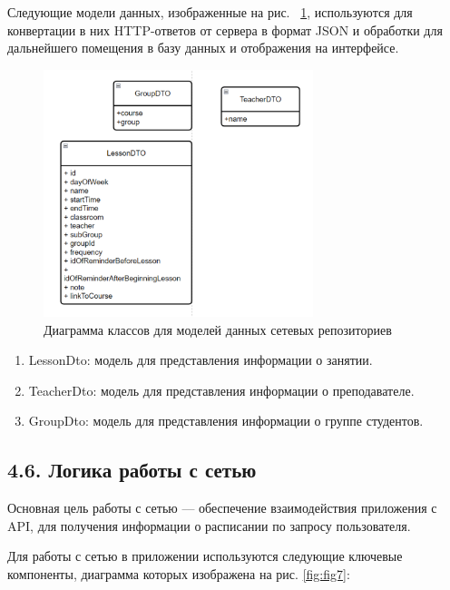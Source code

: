 \documentclass{vsureport}
\begin{document}
Следующие модели данных, изображенные на рис. ~\ref{fig:fig6}, используются для конвертации в них HTTP-ответов от сервера в формат JSON и обработки для дальнейшего помещения в базу данных и отображения на интерфейсе. 
\begin{figure}[H]
	\centering
	\includegraphics[width=0.7\textwidth]{6.png}
	\caption{Диаграмма классов для моделей данных сетевых репозиториев}
	\label{fig:fig6}
\end{figure} 
\begin{enumerate}
	\item LessonDto: модель для представления информации о занятии.
 	\item TeacherDto: модель для представления информации о преподавателе.
	\item GroupDto: модель для представления информации о группе студентов.
\end{enumerate}

\subsection*{4.6. Логика работы с сетью}

Основная цель работы с сетью — обеспечение взаимодействия приложения с API, для получения информации о расписании по запросу пользователя. \cite{ref6}

Для работы с сетью в приложении используются следующие ключевые компоненты, диаграмма которых изображена на рис. \ref{fig:fig7}: 
\end{document}
